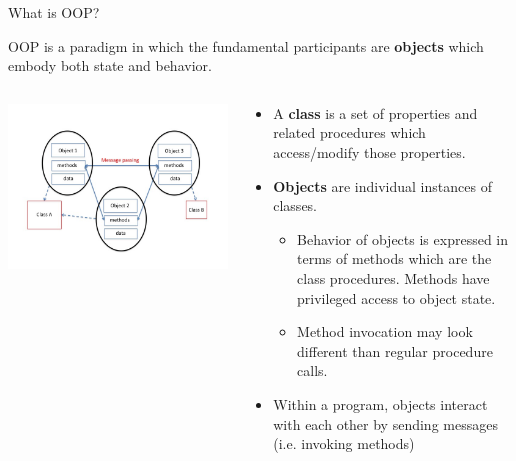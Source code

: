 \documentclass[11pt]{beamer}
\begin{document}

\begin{frame}{What is OOP?} 

OOP is a paradigm in which the fundamental participants are \textbf{objects} which embody both state and behavior.
\begin{columns}[onlytextwidth,t]
    \begin{column}{0.48\textwidth}
        
  \includegraphics[width=1.2\textwidth]{../../shared/oop_building_blocks.jpg} 

  \end{column}
  \begin{column}{0.48\textwidth}
\scriptsize{
    \begin{itemize}
        \item A \textbf{class} is a set of properties and related procedures which access/modify those properties.
        \item \textbf{Objects} are individual instances of classes.
        \begin{itemize}
        \item \scriptsize{Behavior of objects is expressed in terms of methods which are the class procedures. Methods have privileged access to object state.}
        \item \scriptsize{Method invocation may look different than regular procedure calls.}
        \end{itemize}
        \item Within a program, objects interact with each other by sending messages (i.e. invoking methods)
    \end{itemize}
 }
  \end{column}
\end{columns}


\end{frame} 
\end{document}
